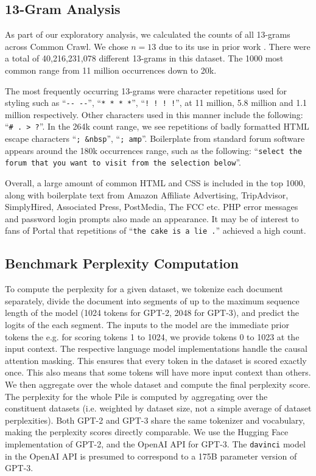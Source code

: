 \documentclass[11pt,a4paper]{article}
\begin{document}
\begin{appendices}
\subsection{13-Gram Analysis}

As part of our exploratory analysis, we calculated the counts of all 13-grams across Common Crawl. We chose $n=13$ due to its use in prior work \citep{GPT3}. There were a total of 40,216,231,078 different 13-grams in this dataset. The 1000 most common range from 11 million occurrences down to 20k.

The most frequently occurring 13-grams were character repetitions used for styling such as ``\texttt{-{}- -{}-}'', ``\texttt{* * * *}'', ``\texttt{! ! ! !}'', at 11 million, 5.8 million and 1.1 million respectively. Other characters used in this manner include the following: ``\texttt{\# . > ?}''. In the 264k count range, we see repetitions of badly formatted HTML escape characters ``\texttt{; \&nbsp}'', ``\texttt{; amp}''. Boilerplate from standard forum software appears around the 180k occurrences range, such as the following: ``\texttt{select the forum that you want to visit from the selection below}''.

Overall, a large amount of common HTML and CSS is included in the top 1000, along with boilerplate text from Amazon Affiliate Advertising, TripAdvisor, SimplyHired, Associated Press, PostMedia, The FCC etc. PHP error messages and password login prompts also made an appearance. It may be of interest to fans of Portal that repetitions of ``\texttt{the cake is a lie .}'' achieved a high count. 

\subsection{Benchmark Perplexity Computation}
\label{apdx:perplexity}

To compute the perplexity for a given dataset, we tokenize each document separately, divide the document into segments of up to the maximum sequence length of the model (1024 tokens for GPT-2, 2048 for GPT-3), and predict the logits of the each segment.
The inputs to the model are the immediate prior tokens the e.g. for scoring tokens 1 to 1024, we provide tokens 0 to 1023 at the input context.
The respective language model implementations handle the causal attention masking.
This ensures that every token in the dataset is scored exactly once.
This also means that some tokens will have more input context than others.
We then aggregate over the whole dataset and compute the final perplexity score.
The perplexity for the whole Pile is computed by aggregating over the constituent datasets (i.e. weighted by dataset size, not a simple average of dataset perplexities).
Both GPT-2 and GPT-3 share the same tokenizer and vocabulary, making the perplexity scores directly comparable. 
We use the Hugging Face \citep{wolf2020transformers} implementation of GPT-2, and the OpenAI API for GPT-3. The \texttt{davinci} model in the OpenAI API is presumed to correspond to a 175B parameter version of GPT-3.


\end{appendices}
\end{document}
